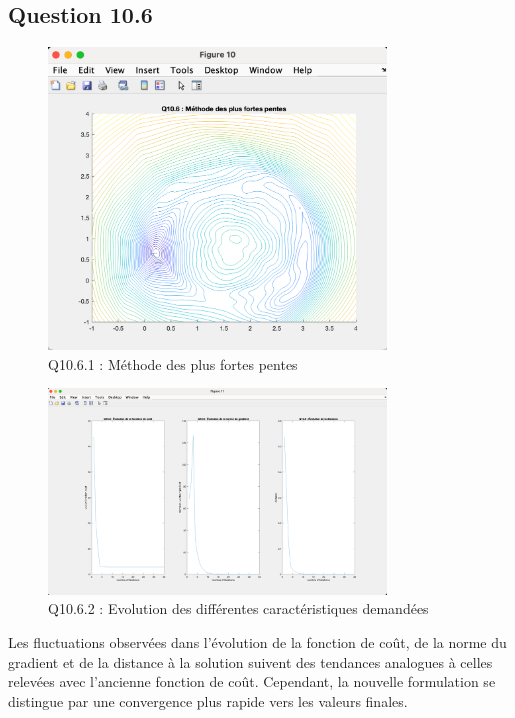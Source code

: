 \documentclass[12pt]{article}
\begin{document}
\subsection{Question 10.6}
\begin{figure}[H]
    \centering
    \includegraphics[width=0.8\textwidth]{Q10.6.1.png} 
    \caption{Q10.6.1 : Méthode des plus fortes pentes}
\end{figure}
\begin{figure}[H]
    \centering
    \includegraphics[width=0.8\textwidth]{Q10.6.2.png} 
    \caption{Q10.6.2 : Evolution des différentes caractéristiques demandées}
\end{figure}
Les fluctuations observées dans l’évolution de la fonction de coût, de la norme du gradient et de la distance à la solution suivent des tendances analogues à celles relevées avec l’ancienne fonction de coût. Cependant, la nouvelle formulation se distingue par une convergence plus rapide vers les valeurs finales.
\end{document}
